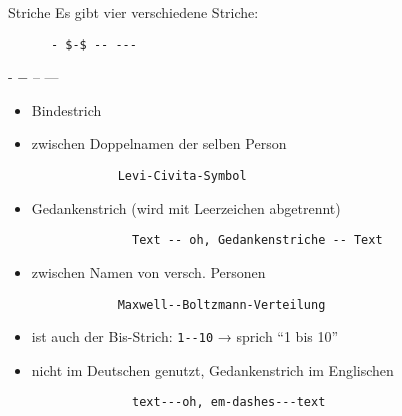 \begin{frame}[fragile]{Striche}
  Es gibt vier verschiedene Striche:
  \begin{CodeExample}{0.49}
    \begin{lstlisting}
      - $-$ -- ---
    \end{lstlisting}
  \CodeResult
    \strut
    - $-$ -- ---
  \end{CodeExample}

  \begin{description}
    \item[- Bindestrich]
      \begin{itemize}
        \item Bindestrich
        \item zwischen Doppelnamen der selben Person
          \begin{lstlisting}
            Levi-Civita-Symbol
          \end{lstlisting}
      \end{itemize}
    \item[-- Halbgeviertstrich (en-dash)]
      \begin{itemize}
        \item Gedankenstrich (wird mit Leerzeichen abgetrennt)
          \begin{lstlisting}
              Text -- oh, Gedankenstriche -- Text
          \end{lstlisting}
          \smallskip
        \item zwischen Namen von versch. Personen
          \begin{lstlisting}
            Maxwell--Boltzmann-Verteilung
          \end{lstlisting}
          \smallskip
        \item ist auch der Bis-Strich:
          \lstinline!1--10! → sprich \enquote{1 bis 10}
      \end{itemize}
    \item[--- Geviertstrich (em-dash)]
      \begin{itemize}
          \item nicht im Deutschen genutzt, Gedankenstrich im Englischen
            \begin{lstlisting}
              text---oh, em-dashes---text
            \end{lstlisting}
      \end{itemize}
  \end{description}
\end{frame}

